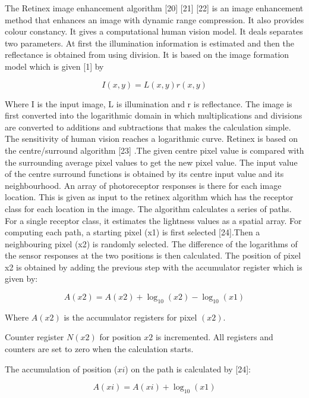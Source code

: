 The Retinex image enhancement algorithm [20] [21] [22] is an image enhancement method that enhances an image with dynamic range compression. It also provides colour constancy. It gives a computational human vision model. It deals separates two parameters. At first the illumination information is estimated and then the reflectance is obtained from using division. It is based on the image formation model which is given [1] by

\begin{equation}
	I (x, y) = L(x, y) r(x, y)
\end{equation}


Where I is the input image, L is illumination and r is reflectance. The image is first converted into the logarithmic domain in which multiplications and divisions are converted to additions and subtractions that makes the calculation simple. The sensitivity of human vision reaches a logarithmic curve. 
    Retinex is based on the centre/surround algorithm [23] .The given centre pixel value is compared with the surrounding average pixel values to get the new pixel value. The input value of the centre surround functions is obtained by its centre input value and its neighbourhood.
	An array of photoreceptor responses is there for each image location. This is given as input to the retinex algorithm which has the receptor class for each location in the image. The algorithm calculates a series of paths. For a single receptor class, it estimates the lightness values as a spatial array.
	For computing each path, a starting pixel (x1) is first selected [24].Then a neighbouring pixel (x2) is randomly selected. The difference of the logarithms of the sensor responses at the two positions is then calculated.
	The position of pixel x2 is obtained by adding the previous step with the accumulator register which is given by:
	
	\begin{equation}
		A(x2) =A(x2) +\log_{10}(x2) −\log_{10}(x1)
	\end{equation}

Where $A(x2)$ is the accumulator registers for pixel $(x2)$.

Counter register $N(x2)$ for position $x2$ is incremented. All registers and counters are set to zero when the calculation starts.

The accumulation of position ($xi$) on the path is calculated by [24]:

\begin{equation}
	A (xi) =A (xi) + \log_{10}(x1)
\end{equation}

